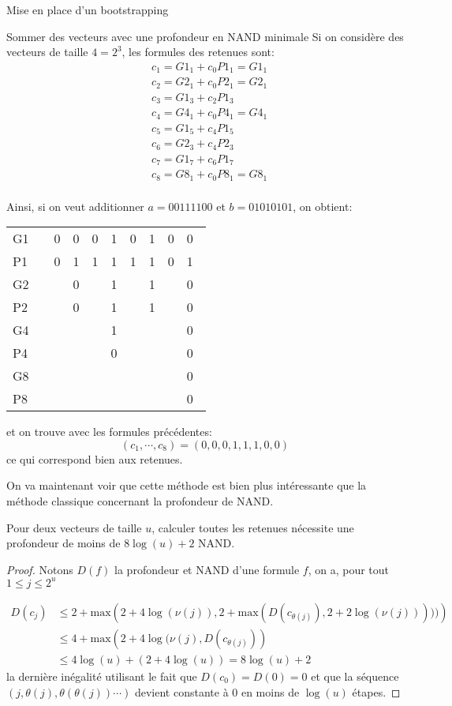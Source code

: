 \begin{section}{Mise en place d'un bootstrapping}
\begin{subsection}{Sommer des vecteurs avec une profondeur en NAND minimale}
Si on considère des vecteurs de taille $4 = 2^3$, les formules des retenues
sont:
\begin{align*}
&c_1 = {G1_1} + c_0 {P1_1} = {G1_1} \\
&c_2 = {G2_1} + c_0 {P2_1} = {G2_1}  \\
&c_3 = {G1_3} + c_2 {P1_3}\\
&c_4 = {G4_1} + c_0 {P4_1} = {G4_1} \\
&c_5 = {G1_5} + c_4 {P1_5}\\
&c_6 = {G2_3} + c_4 {P2_3} \\
&c_7 = {G1_7} + c_6 {P1_7} \\
&c_8 = {G8_1} + c_0 {P8_1} = {G8_1} \\
\end{align*}

Ainsi, si on veut additionner $a = 00111100$ et $b = 01010101$, on obtient:
\begin{center}
\begin{tabular}{llllllllll}
G1 && 0&0&0&1&0&1&0&0 \\
P1 && 0&1&1&1&1&1&0&1 \\
G2 && &0&&1&&1&&0 \\
P2 && &0&&1&&1&&0 \\
G4 && &&&1&&&&0 \\
P4 && &&&0&&&&0 \\
G8 && &&&&&&&0 \\
P8 && &&&&&&&0 \\
\end{tabular}
\end{center}

et on trouve avec les formules précédentes:
\[ (c_1, \cdots, c_8) = (0,0,0,1,1,1,0,0) \]
ce qui correspond bien aux retenues.

On va maintenant voir que cette méthode est bien plus intéressante que la
méthode classique concernant la profondeur de NAND.
\begin{prop}
Pour deux vecteurs de taille $u$, calculer toutes les retenues 
nécessite une profondeur de moins de $8 \log(u) + 2$ NAND.
\end{prop}
\begin{proof}
Notons $D(f)$ la profondeur et NAND d'une formule $f$, on a, pour tout $1 \leq
j \leq 2^u $

\begin{align*}D(c_j) &\leq 2 + \text{max}\left(2 + 4 \log(\nu(j)), 2 +
\text{max}(D(c_{\theta(j)}), 2 + 2 \log(\nu(j)))))\right) \\
&\leq 4 + \text{max}\left(2 + 4 \log(\nu(j), D(c_{\theta(j)})\right) \\
& \leq 4 \log(u) + (2 + 4\log(u)) = 8 \log(u) + 2
\end{align*}
la dernière inégalité utilisant le fait que $D(c_0) = D(0) = 0$ et que 
la séquence $(j, \theta(j), \theta(\theta(j)) \cdots)$ devient constante à 0 en moins de $\log(u)$
étapes.
\end{proof}


\end{subsection}
\end{section}
